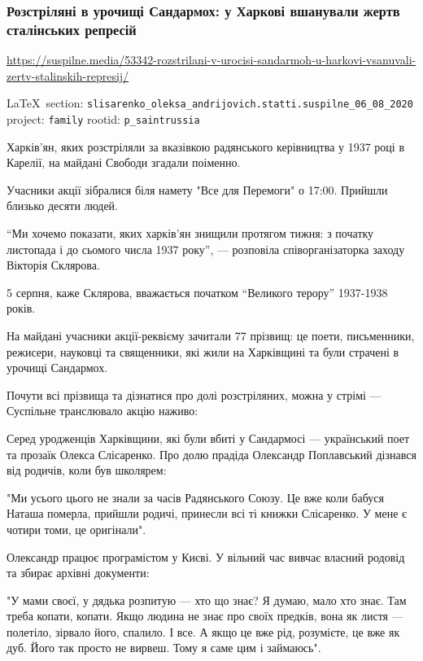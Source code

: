  
 
\subsubsection{Розстріляні в урочищі Сандармох: у Харкові вшанували жертв сталінських репресій}
\url{https://suspilne.media/53342-rozstrilani-v-urocisi-sandarmoh-u-harkovi-vsanuvali-zertv-stalinskih-represij/}
  
\vspace{0.5cm}
 {\ifDEBUG\small\LaTeX~section: \verb|slisarenko_oleksa_andrijovich.statti.suspilne_06_08_2020| project: \verb|family| rootid: \verb|p_saintrussia| \fi}
\vspace{0.5cm}

Харків'ян, яких розстріляли за вказівкою радянського керівництва у 1937 році в
Карелії, на майдані Свободи згадали поіменно.

Учасники акції зібралися біля намету "Все для Перемоги" о 17:00. Прийшли
близько десяти людей.

``Ми хочемо показати, яких харків'ян знищили протягом тижня: з початку листопада
і до сьомого числа 1937 року'', --- розповіла співорганізаторка заходу Вікторія
Склярова.

5 серпня, каже Склярова, вважається початком “Великого терору” 1937-1938 років.

На майдані учасники акції-реквієму зачитали 77 прізвищ: це поети, письменники,
режисери, науковці та священники, які жили на Харківщині та були страчені в
урочищі Сандармох.

Почути всі прізвища та дізнатися про долі розстріляних, можна у стрімі ---
Суспільне транслювало акцію наживо:

Серед уродженців Харківщини, які були вбиті у Сандармосі --- український поет та
прозаїк Олекса Слісаренко. Про долю прадіда Олександр Поплавський дізнався від
родичів, коли був школярем:

"Ми усього цього не знали за часів Радянського Союзу. Це вже коли бабуся Наташа
померла, прийшли родичі, принесли всі ті книжки Слісаренко. У мене є чотири
томи, це оригінали".

Олександр працює програмістом у Києві. У вільний час вивчає власний родовід та
збирає архівні документи:

"У мами своєї, у дядька розпитую — хто що знає? Я думаю, мало хто знає. Там
треба копати, копати. Якщо людина не знає про своїх предків, вона як листя —
полетіло, зірвало його, спалило. І все. А якщо це вже рід, розумієте, це вже як
дуб. Його так просто не вирвеш. Тому я саме цим і займаюсь".

